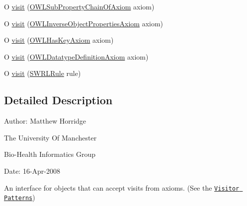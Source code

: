 \begin{DoxyCompactItemize}
\item 
O \hyperlink{interfaceorg_1_1semanticweb_1_1owlapi_1_1model_1_1_o_w_l_axiom_visitor_ex_3_01_o_01_4_a719043cec856910bd7e35d69c551f220}{visit} (\hyperlink{interfaceorg_1_1semanticweb_1_1owlapi_1_1model_1_1_o_w_l_sub_property_chain_of_axiom}{O\-W\-L\-Sub\-Property\-Chain\-Of\-Axiom} axiom)
\item 
O \hyperlink{interfaceorg_1_1semanticweb_1_1owlapi_1_1model_1_1_o_w_l_axiom_visitor_ex_3_01_o_01_4_a420d9d9d9d94ab4493ea985c408358fc}{visit} (\hyperlink{interfaceorg_1_1semanticweb_1_1owlapi_1_1model_1_1_o_w_l_inverse_object_properties_axiom}{O\-W\-L\-Inverse\-Object\-Properties\-Axiom} axiom)
\item 
O \hyperlink{interfaceorg_1_1semanticweb_1_1owlapi_1_1model_1_1_o_w_l_axiom_visitor_ex_3_01_o_01_4_ad9942662eddd42250785ee6a0c0bb8aa}{visit} (\hyperlink{interfaceorg_1_1semanticweb_1_1owlapi_1_1model_1_1_o_w_l_has_key_axiom}{O\-W\-L\-Has\-Key\-Axiom} axiom)
\item 
O \hyperlink{interfaceorg_1_1semanticweb_1_1owlapi_1_1model_1_1_o_w_l_axiom_visitor_ex_3_01_o_01_4_a17c90e9e215d7bfca861aec538ce642e}{visit} (\hyperlink{interfaceorg_1_1semanticweb_1_1owlapi_1_1model_1_1_o_w_l_datatype_definition_axiom}{O\-W\-L\-Datatype\-Definition\-Axiom} axiom)
\item 
O \hyperlink{interfaceorg_1_1semanticweb_1_1owlapi_1_1model_1_1_o_w_l_axiom_visitor_ex_3_01_o_01_4_a190570bb9d105ff50084b7c3a2fb401c}{visit} (\hyperlink{interfaceorg_1_1semanticweb_1_1owlapi_1_1model_1_1_s_w_r_l_rule}{S\-W\-R\-L\-Rule} rule)
\end{DoxyCompactItemize}


\subsection{Detailed Description}
Author\-: Matthew Horridge\par
 The University Of Manchester\par
 Bio-\/\-Health Informatics Group\par
 Date\-: 16-\/\-Apr-\/2008\par
\par
 

An interface for objects that can accept visits from axioms. (See the \href{http://en.wikipedia.org/wiki/Visitor_pattern}{\tt Visitor Patterns}) 

